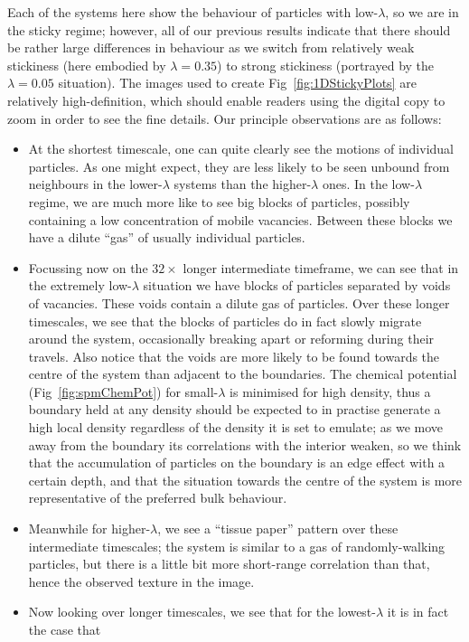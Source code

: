 Each of the systems here show the behaviour of particles with low-$\lambda$, so we are in the sticky regime;
however, all of our previous results indicate that there should be rather large differences in behaviour
as we switch from relatively weak stickiness (here embodied by $\lambda=0.35$) to strong stickiness
(portrayed by the $\lambda = 0.05$ situation). The images used to create Fig~\ref{fig:1DStickyPlots} are
relatively high-definition, which should enable readers using the digital copy to zoom in order to see the fine 
details. Our principle observations are as follows:
\begin{itemize}
 \item At the shortest timescale, one can quite clearly see the motions of individual particles. As one
 might expect, they are less likely to be seen unbound from neighbours in the lower-$\lambda$ systems than
 the higher-$\lambda$ ones. In the low-$\lambda$ regime, we are much more like to see big blocks of 
 particles, possibly containing a low concentration of mobile vacancies. Between these blocks we have a dilute
 ``gas'' of usually individual particles.
 \item Focussing now on the $32\times$ longer intermediate timeframe, we can see that in the extremely 
 low-$\lambda$
 situation we have blocks of particles separated by voids of vacancies. These voids contain a dilute gas
 of particles. Over these longer timescales, we see that the blocks of particles do in fact slowly migrate
 around the system, occasionally breaking apart or reforming during their travels. Also notice that the 
 voids are more likely to be found towards the centre of the system than adjacent to the boundaries.
 The chemical potential
 (Fig~\ref{fig:spmChemPot}) for small-$\lambda$ is minimised for high density, thus a boundary held at any
 density should be expected to in practise generate a high local density regardless of the density it is
 set to emulate; as we move away from the boundary its correlations with the interior weaken, so we think
 that the accumulation of particles on the boundary is an edge effect with a certain depth, and that the
 situation towards the centre of the system is more representative of the preferred bulk behaviour.
 \item Meanwhile for higher-$\lambda$, we see a ``tissue paper'' pattern over these intermediate
 timescales; the system is similar to a gas of randomly-walking particles, but there is a little bit more
 short-range correlation than that, hence the observed texture in the image.
 \item Now looking over longer timescales, we see that for the lowest-$\lambda$ it is in fact the case that 

\end{itemize}

